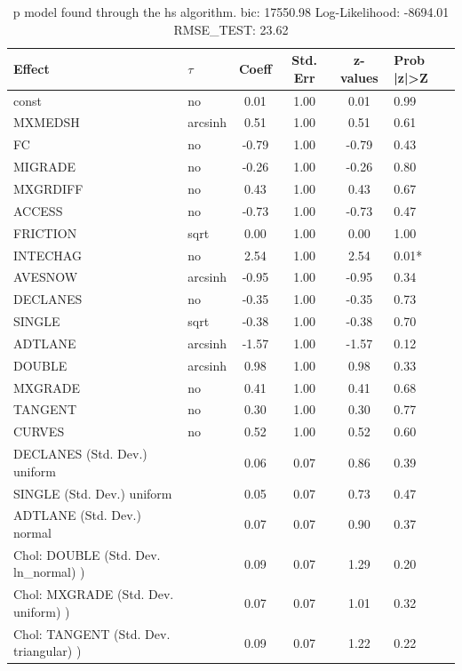 \begin{table}
	\caption{p model found through the hs algorithm. bic: 17550.98 Log-Likelihood: -8694.01 RMSE_TEST: 23.62}
	\begin{center}
		\begin{tabular}{|l|l|c|c|c|l|}
			\hline
			Effect & $\tau$ & Coeff & Std. Err & z-values & Prob |z|>Z \\
			\hline
			const & no & 0.01 & 1.00 & 0.01 & 0.99 \\
			\hline
			MXMEDSH & arcsinh & 0.51 & 1.00 & 0.51 & 0.61 \\
			\hline
			FC & no & -0.79 & 1.00 & -0.79 & 0.43 \\
			\hline
			MIGRADE & no & -0.26 & 1.00 & -0.26 & 0.80 \\
			\hline
			MXGRDIFF & no & 0.43 & 1.00 & 0.43 & 0.67 \\
			\hline
			ACCESS & no & -0.73 & 1.00 & -0.73 & 0.47 \\
			\hline
			FRICTION & sqrt & 0.00 & 1.00 & 0.00 & 1.00 \\
			\hline
			INTECHAG & no & 2.54 & 1.00 & 2.54 & 0.01* \\
			\hline
			AVESNOW & arcsinh & -0.95 & 1.00 & -0.95 & 0.34 \\
			\hline
			DECLANES & no & -0.35 & 1.00 & -0.35 & 0.73 \\
			\hline
			SINGLE & sqrt & -0.38 & 1.00 & -0.38 & 0.70 \\
			\hline
			ADTLANE & arcsinh & -1.57 & 1.00 & -1.57 & 0.12 \\
			\hline
			DOUBLE & arcsinh & 0.98 & 1.00 & 0.98 & 0.33 \\
			\hline
			MXGRADE & no & 0.41 & 1.00 & 0.41 & 0.68 \\
			\hline
			TANGENT & no & 0.30 & 1.00 & 0.30 & 0.77 \\
			\hline
			CURVES & no & 0.52 & 1.00 & 0.52 & 0.60 \\
			\hline
			DECLANES (Std. Dev.) uniform &  & 0.06 & 0.07 & 0.86 & 0.39 \\
			\hline
			SINGLE (Std. Dev.) uniform &  & 0.05 & 0.07 & 0.73 & 0.47 \\
			\hline
			ADTLANE (Std. Dev.) normal &  & 0.07 & 0.07 & 0.90 & 0.37 \\
			\hline
			 Chol: DOUBLE (Std. Dev. ln_normal) ) &  & 0.09 & 0.07 & 1.29 & 0.20 \\
			\hline
			 Chol: MXGRADE (Std. Dev. uniform) ) &  & 0.07 & 0.07 & 1.01 & 0.32 \\
			\hline
			 Chol: TANGENT (Std. Dev. triangular) ) &  & 0.09 & 0.07 & 1.22 & 0.22 \\

\end{tabular}
\end{center}
\end{table}
